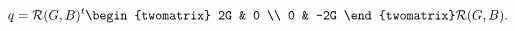 \begin{equation}
\label{eq:qdiag}
  q = \mathcal{R}(G,B)^t \begin{twomatrix}
                           2G &  0 \\
                           0  & -2G
                         \end{twomatrix} \mathcal{R}(G,B).
\end{equation}

